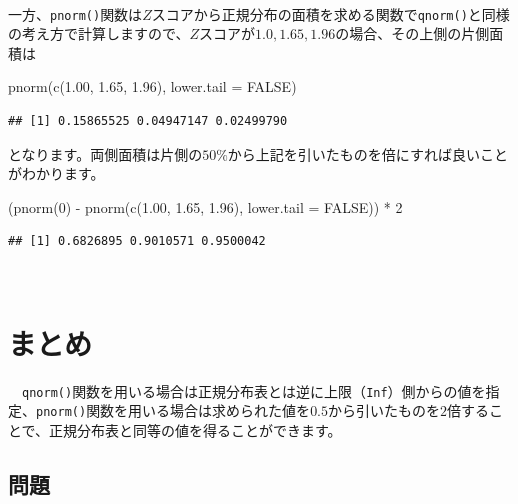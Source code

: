 \documentclass[]{tufte-handout}
\newenvironment{Shaded}{}{}
\newcommand{\AttributeTok}[1]{\textcolor[rgb]{0.49,0.56,0.16}{#1}}
\newcommand{\ConstantTok}[1]{\textcolor[rgb]{0.53,0.00,0.00}{#1}}
\newcommand{\DecValTok}[1]{\textcolor[rgb]{0.25,0.63,0.44}{#1}}
\newcommand{\FloatTok}[1]{\textcolor[rgb]{0.25,0.63,0.44}{#1}}
\newcommand{\FunctionTok}[1]{\textcolor[rgb]{0.02,0.16,0.49}{#1}}
\newcommand{\NormalTok}[1]{#1}
\newcommand{\SpecialCharTok}[1]{\textcolor[rgb]{0.25,0.44,0.63}{#1}}
\begin{document}
　

一方、\texttt{pnorm()}関数は\(Z\)スコアから正規分布の面積を求める関数で\texttt{qnorm()}と同様の考え方で計算しますので、\(Z\)スコアが\(1.0, 1.65, 1.96\)の場合、その上側の片側面積は

\begin{Shaded}
\begin{Highlighting}[numbers=left,,]
\FunctionTok{pnorm}\NormalTok{(}\FunctionTok{c}\NormalTok{(}\FloatTok{1.00}\NormalTok{, }\FloatTok{1.65}\NormalTok{, }\FloatTok{1.96}\NormalTok{), }\AttributeTok{lower.tail =} \ConstantTok{FALSE}\NormalTok{)}
\end{Highlighting}
\end{Shaded}

\begin{verbatim}
## [1] 0.15865525 0.04947147 0.02499790
\end{verbatim}

となります。両側面積は片側の\(50\%\)から上記を引いたものを倍にすれば良いことがわかります。

\begin{Shaded}
\begin{Highlighting}[numbers=left,,]
\NormalTok{(}\FunctionTok{pnorm}\NormalTok{(}\DecValTok{0}\NormalTok{) }\SpecialCharTok{{-}} \FunctionTok{pnorm}\NormalTok{(}\FunctionTok{c}\NormalTok{(}\FloatTok{1.00}\NormalTok{, }\FloatTok{1.65}\NormalTok{, }\FloatTok{1.96}\NormalTok{), }\AttributeTok{lower.tail =} \ConstantTok{FALSE}\NormalTok{)) }\SpecialCharTok{*} \DecValTok{2}
\end{Highlighting}
\end{Shaded}

\begin{verbatim}
## [1] 0.6826895 0.9010571 0.9500042
\end{verbatim}

　

\hypertarget{ux307eux3068ux3081}{%
\section{まとめ}\label{ux307eux3068ux3081}}

　\texttt{qnorm()}関数を用いる場合は正規分布表とは逆に上限（\texttt{Inf}）側からの値を指定、\texttt{pnorm()}関数を用いる場合は求められた値を\(0.5\)から引いたものを\(2\)倍することで、正規分布表と同等の値を得ることができます。

\newpage

\hypertarget{ux554fux984c}{%
\subsection{問題}\label{ux554fux984c}}
\end{document}
